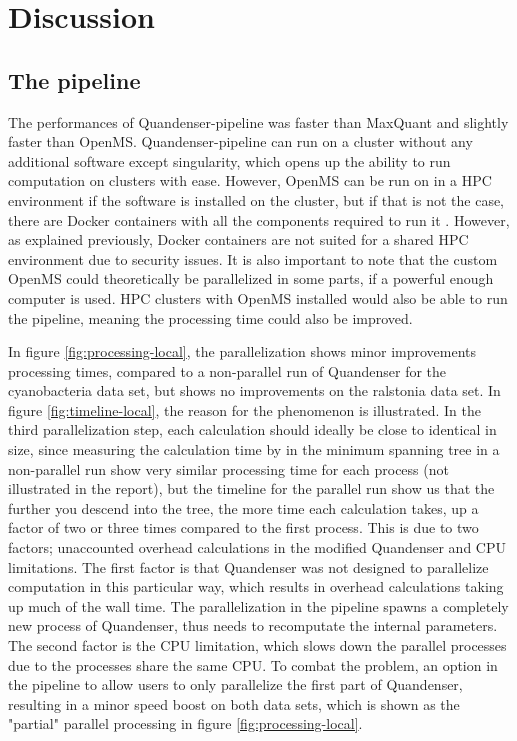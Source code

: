 \section{Discussion}

\subsection{The pipeline}
The performances of Quandenser-pipeline was faster than MaxQuant and slightly faster than OpenMS. Quandenser-pipeline can run on a cluster without any additional software except singularity, which opens up the ability to run computation on clusters with ease. However, OpenMS can be run on in a HPC environment if the software is installed on the cluster, but if that is not the case, there are Docker containers with all the components required to run it \cite{openms-hpc}. However, as explained previously, Docker containers are not suited for a shared HPC environment due to security issues.
It is also important to note that the custom OpenMS could theoretically be parallelized in some parts, if a powerful enough computer is used. HPC clusters with OpenMS installed would also be able to run the pipeline, meaning the processing time could also be improved.

In figure \ref{fig:processing-local}, the parallelization shows minor improvements processing times, compared to a non-parallel run of Quandenser for the cyanobacteria data set, but shows no improvements on the ralstonia data set. In figure \ref{fig:timeline-local}, the reason for the phenomenon is illustrated. In the third parallelization step, each calculation should ideally be close to identical in size, since measuring the calculation time by in the minimum spanning tree in a non-parallel run show very similar processing time for each process (not illustrated in the report), but the timeline for the parallel run show us that the further you descend into the tree, the more time each calculation takes, up a factor of two or three times compared to the first process. This is due to two factors; unaccounted overhead calculations in the modified Quandenser and CPU limitations. The first factor is that Quandenser was not designed to parallelize computation in this particular way, which results in overhead calculations taking up much of the wall time. The parallelization in the pipeline spawns a completely new process of Quandenser, thus needs to recomputate the internal parameters. The second factor is the CPU limitation, which slows down the parallel processes due to the processes share the same CPU. To combat the problem, an option in the pipeline to allow users to only parallelize the first part of Quandenser, resulting in a minor speed boost on both data sets, which is shown as the "partial" parallel processing in figure \ref{fig:processing-local}.

